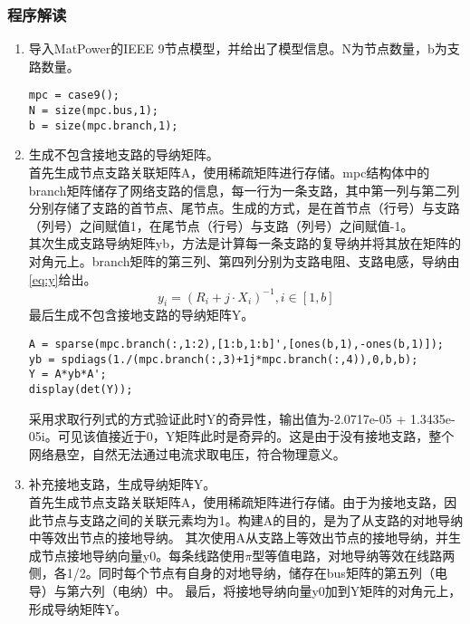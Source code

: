 \documentclass[a4paper,12pt]{article}
\begin{document}
    \subsubsection{程序解读}
    \begin{enumerate}
      \item 导入MatPower的IEEE 9节点模型，并给出了模型信息。N为节点数量，b为支路数量。
      \begin{lstlisting}[style=Matlab-editor,basicstyle=\mlttfamily]
mpc = case9();
N = size(mpc.bus,1);
b = size(mpc.branch,1);
      \end{lstlisting}
      \item 生成不包含接地支路的导纳矩阵。\\
      首先生成节点支路关联矩阵A，使用稀疏矩阵进行存储。mpc结构体中的branch矩阵储存了网络支路的信息，每一行为一条支路，其中第一列与第二列分别存储了支路的首节点、尾节点。生成的方式，是在首节点（行号）与支路（列号）之间赋值1，在尾节点（行号）与支路（列号）之间赋值-1。\\
      其次生成支路导纳矩阵yb，方法是计算每一条支路的复导纳并将其放在矩阵的对角元上。branch矩阵的第三列、第四列分别为支路电阻、支路电感，导纳由\cref{eq:y}给出。\\
      \begin{equation}
        \label{eq:y}
        y_i = (R_i + j \cdot X_i)^{-1}, i\in[1, b]
      \end{equation}
      最后生成不包含接地支路的导纳矩阵Y。\\
      \begin{lstlisting}[style=Matlab-editor,basicstyle=\mlttfamily]
A = sparse(mpc.branch(:,1:2),[1:b,1:b]',[ones(b,1),-ones(b,1)]);
yb = spdiags(1./(mpc.branch(:,3)+1j*mpc.branch(:,4)),0,b,b);
Y = A*yb*A';
display(det(Y));
      \end{lstlisting}
      采用求取行列式的方式验证此时Y的奇异性，输出值为-2.0717e-05 + 1.3435e-05i。可见该值接近于0，Y矩阵此时是奇异的。这是由于没有接地支路，整个网络悬空，自然无法通过电流求取电压，符合物理意义。
      \item 补充接地支路，生成导纳矩阵Y。\\
      首先生成节点支路关联矩阵A，使用稀疏矩阵进行存储。由于为接地支路，因此节点与支路之间的关联元素均为1。构建A的目的，是为了从支路的对地导纳中等效出节点的接地导纳。
      其次使用A从支路上等效出节点的接地导纳，并生成节点接地导纳向量y0。每条线路使用$\pi$型等值电路，对地导纳等效在线路两侧，各1/2。同时每个节点有自身的对地导纳，储存在bus矩阵的第五列（电导）与第六列（电纳）中。
      最后，将接地导纳向量y0加到Y矩阵的对角元上，形成导纳矩阵Y。

\end{enumerate}
\end{document}
